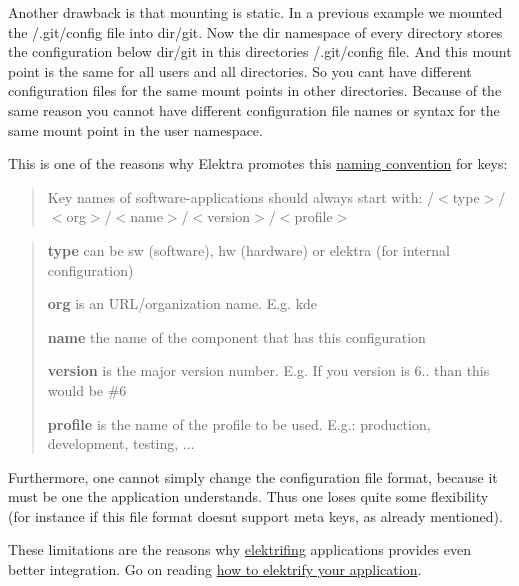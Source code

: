 Another drawback is that mounting is static. In a previous example we mounted the {\ttfamily /.git/config} file into {\ttfamily dir/git}. Now the {\ttfamily dir} namespace of every directory stores the configuration below {\ttfamily dir/git} in this directories {\ttfamily /.git/config} file. And this mount point is the same for all users and all directories. So you can\textquotesingle{}t have different configuration files for the same mount points in other directories. Because of the same reason you cannot have different configuration file names or syntax for the same mount point in the {\ttfamily user} namespace.

This is one of the reasons why Elektra promotes this \hyperlink{doc_help_elektra-key-names_md}{naming convention} for keys\+:

\begin{quote}
Key names of software-\/applications should always start with\+: {\ttfamily /$<$type$>$/$<$org$>$/$<$name$>$/$<$version$>$/$<$profile$>$} \end{quote}


\begin{quote}

\begin{DoxyItemize}
\item {\bfseries type} can be {\ttfamily sw} (software), {\ttfamily hw} (hardware) or {\ttfamily elektra} (for internal configuration)
\item {\bfseries org} is an U\+R\+L/organization name. E.\+g. {\ttfamily kde}
\item {\bfseries name} the name of the component that has this configuration
\item {\bfseries version} is the major version number. E.\+g. If you version is 6.. than this would be {\ttfamily \#6}
\item {\bfseries profile} is the name of the profile to be used. E.\+g.\+: {\ttfamily production}, {\ttfamily development}, {\ttfamily testing}, ... 
\end{DoxyItemize}\end{quote}


Furthermore, one cannot simply change the configuration file format, because it must be one the application understands. Thus one loses quite some flexibility (for instance if this file format doesn\textquotesingle{}t support meta keys, as already mentioned).

These limitations are the reasons why \hyperlink{doc_help_elektra-glossary_md}{elektrifing} applications provides even better integration. Go on reading \hyperlink{doc_tutorials_application-integration_md}{how to elektrify your application}. 